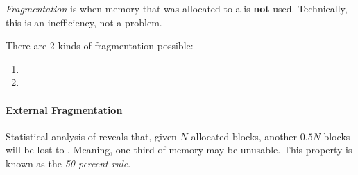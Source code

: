 \begin{definition}[Fragmentation]\label{def:Fragmentation}
  \emph{Fragmentation} is when memory that was allocated to a  is \textbf{not} used.
  Technically, this is an inefficiency, not a problem.

  There are 2 kinds of fragmentation possible:
  \begin{enumerate}[noitemsep]
  \item {}
  \item {}
  \end{enumerate}
\end{definition}

\paragraph{External Fragmentation}\label{par:External_Fragmentation}
Statistical analysis of  reveals that, given $N$ allocated blocks, another $0.5 N$ blocks will be lost to .
Meaning, one-third of memory may be unusable.
This property is known as the \emph{50-percent rule}.


